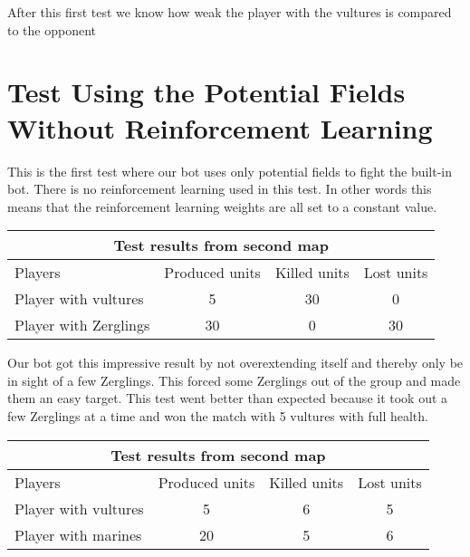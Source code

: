 After this first test we know how weak the player with the vultures is compared to the opponent
\section{Test Using the Potential Fields Without Reinforcement Learning} %
This is the first test where our bot uses only potential fields  to fight the built-in bot. There is no reinforcement learning used in this test. In other words this means that the reinforcement learning weights are all set to a constant value.\\

\begin{centering}
\begin{table}
 \begin{tabular}{|l|c|c|c|}
	\multicolumn{4}{c}{Test results from second map} \\
	\hline
	Players & Produced units & Killed units & Lost units\\
	\hline
	\hline
		Player with vultures & 5 & 30 & 0\\
	\hline
		Player with Zerglings & 30 & 0 & 30\\
	\hline

\end{tabular}
\end{table}
\end{centering}

Our bot got this impressive result by not overextending itself and thereby only be in sight of a few Zerglings. This forced some Zerglings out of the group and made them an easy target. This test went better than expected because it took out a few Zerglings at a time and won the match with 5 vultures with full health.\\

\begin{centering}
\begin{table}
 \begin{tabular}{|l|c|c|c|}
	\multicolumn{4}{c}{Test results from second map} \\
	\hline
	Players & Produced units & Killed units & Lost units\\
	\hline
	\hline
		Player with vultures & 5 & 6 & 5\\
	\hline
		Player with marines & 20 & 5 & 6\\
	\hline

\end{tabular}
\end{table}
\end{centering}


